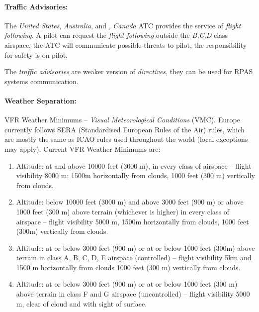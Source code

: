 \paragraph{Traffic Advisories:} The \emph{United States}, \emph{Australia}, and , \emph{Canada} ATC provides the service of \emph{flight following}. A pilot can request the \emph{flight following} outside the \emph{B,C,D} class airspace, the ATC will communicate possible threats to pilot, the responsibility for safety is on pilot.

\begin{note}
    The \emph{traffic advisories} are weaker version of \emph{directives}, they can be used for RPAS systems communication.
\end{note}


\paragraph{Weather Separation:} VFR Weather Minimums – \emph{Visual Meteorological Conditions} (VMC).  Europe currently follows SERA (Standardised European Rules of the Air) rules, which are mostly the same as ICAO rules used throughout the world (local exceptions may apply). Current VFR Weather Minimums are:

\begin{enumerate}
    \item Altitude: at and above 10000 feet (3000 m), in every class of airspace – flight visibility 8000 m; 1500m horizontally from clouds, 1000 feet (300 m) vertically from clouds.
    
    \item Altitude: below 10000 feet (3000 m) and above 3000 feet (900 m) or above 1000 feet  (300 m) above terrain (whichever is higher) in every class of airspace – flight visibility 5000 m, 1500m horizontally from clouds, 1000 feet (300m) vertically from clouds.

    \item Altitude: at or below 3000 feet (900 m) or at or below 1000 feet (300m) above terrain in class A, B, C, D, E airspace (controlled) – flight visibility 5km and 1500 m horizontally from clouds 1000 feet (300 m) vertically from clouds.

    \item Altitude: at or below 3000 feet (900 m) or at or below 1000 feet (300 m) above terrain in class F and G airspace (uncontrolled) – flight visibility 5000 m, clear of cloud and with sight of surface. 
\end{enumerate}

